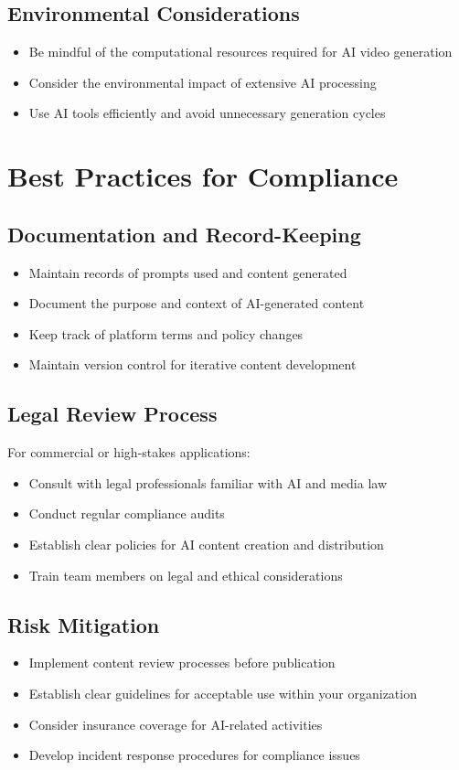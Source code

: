 \subsection{Environmental Considerations}
\begin{itemize}
\item Be mindful of the computational resources required for AI video generation
\item Consider the environmental impact of extensive AI processing
\item Use AI tools efficiently and avoid unnecessary generation cycles
\end{itemize}

\section{Best Practices for Compliance}

\subsection{Documentation and Record-Keeping}
\begin{itemize}
\item Maintain records of prompts used and content generated
\item Document the purpose and context of AI-generated content
\item Keep track of platform terms and policy changes
\item Maintain version control for iterative content development
\end{itemize}

\subsection{Legal Review Process}
For commercial or high-stakes applications:
\begin{itemize}
\item Consult with legal professionals familiar with AI and media law
\item Conduct regular compliance audits
\item Establish clear policies for AI content creation and distribution
\item Train team members on legal and ethical considerations
\end{itemize}

\subsection{Risk Mitigation}
\begin{itemize}
\item Implement content review processes before publication
\item Establish clear guidelines for acceptable use within your organization
\item Consider insurance coverage for AI-related activities
\item Develop incident response procedures for compliance issues
\end{itemize}

